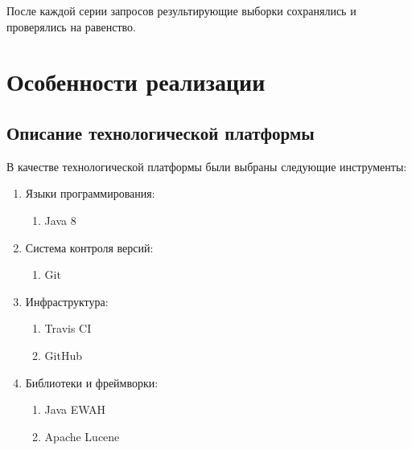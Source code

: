 \documentclass{matmex-diploma}
\begin{document}
            После каждой серии запросов результирующие выборки сохранялись и проверялись на равенство.
        
    
    
\section{Особенности реализации}
    \subsection{Описание технологической платформы}
        В качестве технологической платформы были выбраны следующие инструменты:
        \begin{enumerate}
            \item Языки программирования:
                \begin{enumerate}
                    \item Java 8
                \end{enumerate}
            \item Система контроля версий:
                \begin{enumerate}
                    \item Git
                \end{enumerate}
            \item Инфраструктура:
                \begin{enumerate}
                    \item Travis CI
                    \item GitHub
                \end{enumerate}
            \item Библиотеки и фреймворки:
                \begin{enumerate}
                    \item Java EWAH
                    \item Apache Lucene
                \end{enumerate}    
        \end{enumerate}
        
\end{document}

